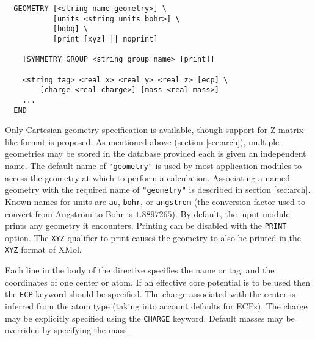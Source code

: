 \label{sec:geom}

\begin{verbatim}
  GEOMETRY [<string name geometry>] \
           [units <string units bohr>] \
           [bqbq] \
           [print [xyz] || noprint]
    
    [SYMMETRY GROUP <string group_name> [print]]

    <string tag> <real x> <real y> <real z> [ecp] \
        [charge <real charge>] [mass <real mass>]
    ...
  END
\end{verbatim}

Only Cartesian geometry specification is available, though support for
Z-matrix-like format is proposed.  As mentioned above (section
\ref{sec:arch}), multiple geometries may be stored in the database
provided each is given an independent name.  The default name of
\verb+"geometry"+ is used by most application modules to access the
geometry at which to perform a calculation.  Associating a named
geometry with the required name of \verb+"geometry"+ is described in
section \ref{sec:arch}.  Known names for units are \verb+au+,
\verb+bohr+, or \verb+angstrom+ (the conversion factor used to convert
from Angstr\"{o}m to Bohr is $1.8897265$). By default, the input
module prints any geometry it encounters.  Printing can be disabled
with the \verb+PRINT+ option.  The \verb+XYZ+ qualifier to print
causes the geometry to also be printed in the \verb+XYZ+ format of
XMol.  

Each line in the body of the directive specifies the name or tag, and
the coordinates of one center or atom.  If an effective core potential
is to be used then the \verb+ECP+ keyword should be specified.  The
charge associated with the center is inferred from the atom type
(taking into account defaults for ECPs).  The charge may be explicitly
specified using the \verb+CHARGE+ keyword.  Default masses may be
overriden by specifying the mass.

